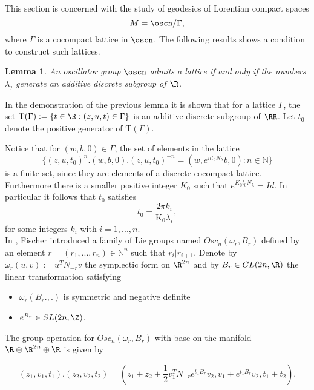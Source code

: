 \documentclass[11pt]{amsart}
\theoremstyle{plain}
\newtheorem{lem}[thm]{Lemma}
\theoremstyle{definition}
\theoremstyle{remark}
\begin{document}
	This section is concerned with the study of geodesics of Lorentian compact spaces  $$M=\oscn/ \Gamma,$$ where $\Gamma$ is a cocompact lattice in $\oscn$. The following results shows a condition to construct such lattices. 
	
	\begin{lem}\cite{MeRe}\label{lema_medina}
		An oscillator group $\oscn$ admits a lattice if and only if the numbers $\lambda_j$ generate an additive discrete subgroup of $\R$.
	\end{lem}
	
	In the demonstration of the previous lemma it is  shown that for a lattice $\Gamma$, the set $\mathrm{T}(\Gamma):=\{ t \in \R : (z,u,t) \in \Gamma \}$ is an additive discrete subgroup of $\RR$. %
	 Let $t_0$ denote the positive generator of $\mathrm{T}(\Gamma)$. 
	
	Notice that for $(w,b,0) \in \Gamma$, the set of elements in the lattice
	\begin{equation*}
		\{ (z,u,t_0)^n.(w,b,0).(z,u,t_0)^{-n}=(w,e^{n t_0 N_{\lambda}}b,0) : n \in \mathbb{N} \}
	\end{equation*}
	 is a finite set, since they are elements of a discrete cocompact lattice. Furthermore there is a smaller positive integer $K_0$ such that $e^{K_0 t_0 N_{\lambda}} = Id$. In particular it follows that $t_0$ satisfies
	\begin{equation} \label{oscilator-N}
		t_0=\frac{2 \pi k_i}{\mathrm{K_0} \lambda_i},
	\end{equation}
	for some integers $k_i$ with $i=1, ..., n$.\\
	
	In \cite{MF}, Fischer introduced a family of Lie groups named $Osc_n(\omega_r, B_r)$ defined by an element $r=(r_1, ..., r_n) \in \mathbb{N}^n$ such that $r_i | r_{i+1}$. Denote by $\omega_r(u,v):=u^TN_{-r}v$ the symplectic form on $\R^{2n}$ and by $B_r \in GL(2n, \R)$ the linear transformation satisfying
	
	\begin{itemize}
		\item $\omega_r(B_r.,.)$ is symmetric and negative definite
		\item $e^{B_r} \in SL(2n,\Z)$.
	\end{itemize}
	
	The group operation for $Osc_n(\omega_r, B_r)$ with base on the manifold $\R \oplus \R^{2n} \oplus \R$ is given by
	
	\begin{equation}
		(z_1,v_1,t_1) . (z_2,v_2,t_2)=(z_1+z_2+\frac{1}{2}v_1^{T}N_{-r} e^{t_1 B_r}v_2,v_1+e^{t_1 B_r}v_2,t_1+t_2).
	\end{equation}
	
\end{document}
